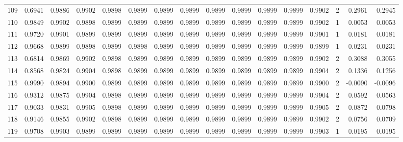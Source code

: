 \begin{tabular}{lrrrrrrrrrrrrrrr}
109 &      0.6941 &  0.9886 &  0.9902 &  0.9898 &  0.9899 &  0.9899 &  0.9899 &  0.9899 &  0.9899 &  0.9899 &   0.9899 &     0.9902 &      2 &                    0.2961 &                     0.2945 \\
110 &      0.9849 &  0.9902 &  0.9898 &  0.9899 &  0.9899 &  0.9899 &  0.9899 &  0.9899 &  0.9899 &  0.9899 &   0.9899 &     0.9902 &      1 &                    0.0053 &                     0.0053 \\
111 &      0.9720 &  0.9901 &  0.9899 &  0.9899 &  0.9899 &  0.9899 &  0.9899 &  0.9899 &  0.9899 &  0.9899 &   0.9899 &     0.9901 &      1 &                    0.0181 &                     0.0181 \\
112 &      0.9668 &  0.9899 &  0.9898 &  0.9899 &  0.9898 &  0.9899 &  0.9899 &  0.9899 &  0.9899 &  0.9899 &   0.9899 &     0.9899 &      1 &                    0.0231 &                     0.0231 \\
113 &      0.6814 &  0.9869 &  0.9902 &  0.9898 &  0.9899 &  0.9899 &  0.9899 &  0.9899 &  0.9899 &  0.9899 &   0.9899 &     0.9902 &      2 &                    0.3088 &                     0.3055 \\
114 &      0.8568 &  0.9824 &  0.9904 &  0.9898 &  0.9899 &  0.9899 &  0.9899 &  0.9899 &  0.9899 &  0.9899 &   0.9899 &     0.9904 &      2 &                    0.1336 &                     0.1256 \\
115 &      0.9990 &  0.9894 &  0.9900 &  0.9899 &  0.9899 &  0.9899 &  0.9899 &  0.9899 &  0.9899 &  0.9899 &   0.9899 &     0.9900 &      2 &                   -0.0090 &                    -0.0096 \\
116 &      0.9312 &  0.9875 &  0.9904 &  0.9898 &  0.9899 &  0.9899 &  0.9899 &  0.9899 &  0.9899 &  0.9899 &   0.9899 &     0.9904 &      2 &                    0.0592 &                     0.0563 \\
117 &      0.9033 &  0.9831 &  0.9905 &  0.9898 &  0.9899 &  0.9899 &  0.9899 &  0.9899 &  0.9899 &  0.9899 &   0.9899 &     0.9905 &      2 &                    0.0872 &                     0.0798 \\
118 &      0.9146 &  0.9855 &  0.9902 &  0.9898 &  0.9899 &  0.9899 &  0.9899 &  0.9899 &  0.9899 &  0.9899 &   0.9899 &     0.9902 &      2 &                    0.0756 &                     0.0709 \\
119 &      0.9708 &  0.9903 &  0.9899 &  0.9899 &  0.9899 &  0.9899 &  0.9899 &  0.9899 &  0.9899 &  0.9899 &   0.9899 &     0.9903 &      1 &                    0.0195 &                     0.0195 \\

\end{tabular}
